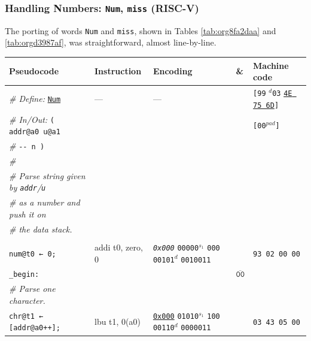 \documentclass[a4paper,12pt,final]{article}
\begin{document}
\subsubsection{Handling Numbers: \texttt{Num}, \texttt{miss} (RISC-V)}
\label{sec:org55b1483}

The porting of words \texttt{Num} and \texttt{miss}, shown in Tables
\ref{tab:org8fa2daa} and \ref{tab:orgd3987af}, was straightforward, almost
line-by-line.

\begin{table}[!htbp] \begin{adjustwidth}{-1cm}{-1cm} \fontsize{8}{9.600000}\selectfont
\begin{center}
\begin{tabular}{l|ll|l|l}
\textbf{Pseudocode} & \textbf{Instruction} & \textbf{Encoding} & \textbf{\&} & \textbf{Machine code}\\[0pt]
\hline
\emph{\# Define:} \uline{\texttt{Num}} & --- & --- &  & \texttt{[99} \(^{d}\)​\texttt{03} \uline{\texttt{4E 75 6D}}​\texttt{]}\\[0pt]
\emph{\# In/Out:}    \texttt{( addr@a0 u@a1} &  &  &  & \texttt{[00}​\(^{pad}\)​\texttt{]}\\[0pt]
\emph{\#}\hspace{3.35em} \texttt{-​- n )} &  &  &  & \\[0pt]
\emph{\#} &  &  &  & \\[0pt]
\emph{\# Parse string given by \texttt{addr}​/​\texttt{u}} &  &  &  & \\[0pt]
\emph{\# as a number and push it on} &  &  &  & \\[0pt]
\emph{\# the data stack.} &  &  &  & \\[0pt]
 &  &  &  & \\[0pt]
\hspace{1.053000em} \texttt{num@t0 ← 0;} & addi t0, zero, 0 & \emph{\texttt{0x000}}                    \texttt{00000}​\(^{s_{1}}\) \texttt{000} \texttt{00101}​\(^{d}\)  \texttt{0010011} &  & \texttt{93 02 00 00}\\[0pt]
\texttt{\_begin:} &  &  & \(\overline{\texttt{00}}\) & \\[0pt]
\hspace{1.053000em} \emph{\# Parse one character.} &  &  &  & \\[0pt]
\hspace{1.053000em} \texttt{chr@t1 ← [addr@a0++];} & lbu t1, 0(a0) & \uline{\texttt{0x000}}                    \texttt{01010}​\(^{s_{1}}\) \texttt{100} \texttt{00110}​\(^{d}\)  \texttt{0000011} &  & \texttt{03 43 05 00}\\[0pt]

\end{tabular}
\end{center}
\end{adjustwidth}
\end{table}
\end{document}
